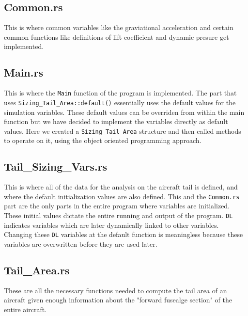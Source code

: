 \subsection{Common.rs}
\begin{comment}
\end{comment}
This is where common variables like the graviational acceleration and certain common functions like definitions of lift coefficient and dynamic presure get implemented.


\subsection{Main.rs}
\begin{comment}
\end{comment}
This is where the \texttt{Main} function of the program is implemented. The part that uses \texttt{Sizing\_Tail\_Area::default()} essentially uses the default values for the simulation variables. These default values can be overriden from within the main function but we have decided to implement the variables directly as default values. Here we created a \texttt{Sizing\_Tail\_Area} structure and then called methods to operate on it, using the object oriented programming approach.
 

\subsection{Tail\_Sizing\_Vars.rs}
\begin{comment}
\end{comment}
This is where all of the data for the analysis on the aircraft tail is defined, and where the default initialization values are also defined. This and the \texttt{Common.rs} part are the only parts in the entire program where variables are initialized. These initial values dictate the entire running and output of the program. \texttt{DL} indicates variables which are later dynamically linked to other variables. Changing these \texttt{DL} variables at the default function is meaningless because these variables are overwritten before they are used later.


\subsection{Tail\_Area.rs}
\begin{comment}
\end{comment}
These are all the necessary functions needed to compute the tail area of an aircraft given enough information about the "forward fusealge section" of the entire aircraft.


